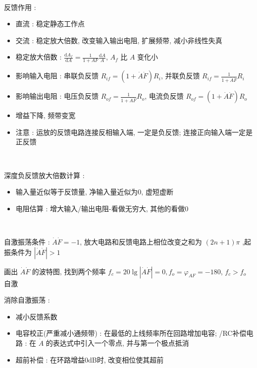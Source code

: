 \documentclass[UTF8, 12pt]{ctexart}
\begin{document}
	~

	\noindent
	反馈作用 :
	\begin{itemize}[leftmargin = 4em]
		\item 直流 : 稳定静态工作点
		\item 交流 : 稳定放大倍数, 改变输入输出电阻, 扩展频带, 减小非线性失真
		\item 稳定放大倍数 : $ \frac{\mathrm{d}A_{f}}{\mathrm{d}A} = \frac{1}{1+AF}\frac{\mathrm{d}A}{A} $, $ A_{f} $ 比 $ A $ 变化小
		\item 影响输入电阻 : 串联负反馈 $ R_{if} = (1+\dot{A}\dot{F})R_{i} $, 并联负反馈 $ R_{if} = \frac{1}{1+\dot{A}\dot{F}}R_{i} $
		\item 影响输出电阻 : 电压负反馈 $ R_{of} = \frac{1}{1+\dot{A}\dot{F}}R_{o} $, 电流负反馈 $ R_{of} = (1+\dot{A}\dot{F})R_{o} $
		\item 增益下降, 频带变宽
		\item 注意 : 运放的反馈电路连接反相输入端, 一定是负反馈; 连接正向输入端一定是正反馈
	\end{itemize}

	~

	\noindent
	深度负反馈放大倍数计算 :
	\begin{itemize}[leftmargin = 4em]
		\item 输入量近似等于反馈量, 净输入量近似为0, 虚短虚断
		\item 电阻估算 : 增大输入/输出电阻-看做无穷大, 其他的看做0
	\end{itemize}

	~

	\noindent
	自激振荡条件 :  $ \dot{A}\dot{F} = -1 $, 放大电路和反馈电路上相位改变之和为 $ (2n+1)\pi $ ,起振条件为 $ |\dot{A}\dot{F}| > 1 $

	画出 $ \dot{A}\dot{F} $ 的波特图, 找到两个频率 $ f_{c} = 20\lg|\dot{A}\dot{F}| = 0, f_{o} = \varphi_{AF} = -180 $, $ f_{c} > f_{o} $ 自激

	消除自激振荡 :
	\begin{itemize}[leftmargin = 4em]
		\item 减小反馈系数
		\item 电容校正(严重减小通频带) : 在最低的上线频率所在回路增加电容; /RC补偿电路 : 在 $ \dot{A} $ 的表达式中引入一个零点, 并与第一个极点抵消
		\item 超前补偿 : 在环路增益0dB时, 改变相位使其超前
	\end{itemize}
\end{document}
